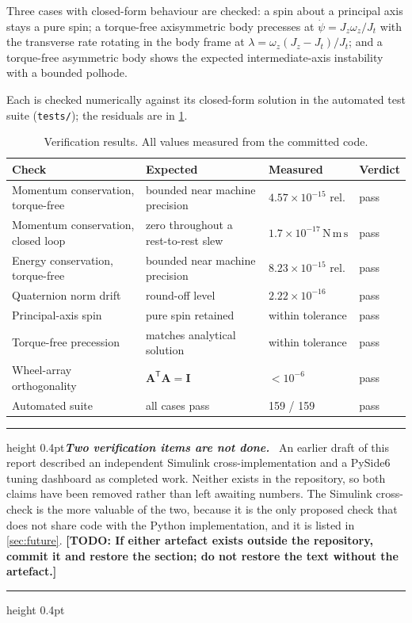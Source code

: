 \documentclass[conference,10pt,a4paper]{IEEEtran}
\newcommand{\remarkrule}{\par\nobreak\vspace{2pt}%
  \hrule height 0.4pt\vspace{4pt}\nobreak}
\newenvironment{cautionbox}[1][Caveat]
  {\par\medskip\remarkrule\noindent\small\textbf{\textit{#1.}}\ \ignorespaces}
  {\par\vspace{3pt}\hrule height 0.4pt\par\medskip\ignorespacesafterend}
\newcommand{\TODO}[1]{\textbf{[TODO: #1]}}
\newcommand{\TODO}[1]{}
\newcommand{\mat}[1]{\bm{#1}}
\newcommand{\T}{^{\mathsf{T}}}
\newcommand{\unit}[1]{\ensuremath{\,\mathrm{#1}}}
\begin{document}
Three cases with closed-form behaviour are checked: a spin about a principal
axis stays a pure spin; a torque-free axisymmetric body precesses at
$\dot\psi = J_z\omega_z/J_t$ with the transverse rate rotating in the body frame
at $\lambda=\omega_z(J_z-J_t)/J_t$; and a torque-free asymmetric body shows the
expected intermediate-axis instability with a bounded polhode.

Each is checked numerically against its closed-form solution in the automated
test suite (\texttt{tests/}); the residuals are in \cref{tab:verification}.

\begin{table}[!t]
\centering
\caption{Verification results. All values measured from the committed code.}
\label{tab:verification}
\footnotesize
\begin{tabularx}{\textwidth}{@{}p{}Xll@{}}
\toprule
\textbf{Check} & \textbf{Expected} & \textbf{Measured} & \textbf{Verdict} \\
\midrule
Momentum conservation, torque-free & bounded near machine precision & $4.57\times10^{-15}$ rel. & pass \\
Momentum conservation, closed loop & zero throughout a rest-to-rest slew & $1.7\times10^{-17}\unit{N\,m\,s}$ & pass \\
Energy conservation, torque-free   & bounded near machine precision & $8.23\times10^{-15}$ rel. & pass \\
Quaternion norm drift              & round-off level                & $2.22\times10^{-16}$ & pass \\
Principal-axis spin                & pure spin retained             & within tolerance & pass \\
Torque-free precession             & matches analytical solution    & within tolerance & pass \\
Wheel-array orthogonality          & $\mat{A}\T\mat{A}=\mat{I}$     & $<10^{-6}$ & pass \\
Automated suite                    & all cases pass                 & 159 / 159 & pass \\
\bottomrule
\end{tabularx}
\end{table}

\begin{cautionbox}[Two verification items are not done]
An earlier draft of this report described an independent Simulink
cross-implementation and a PySide6 tuning dashboard as completed work. Neither
exists in the repository, so both claims have been removed rather than left
awaiting numbers. The Simulink cross-check is the more valuable of the two,
because it is the only proposed check that does not share code with the Python
implementation, and it is listed in \cref{sec:future}. \TODO{If either artefact
exists outside the repository, commit it and restore the section; do not
restore the text without the artefact.}
\end{cautionbox}
\end{document}
